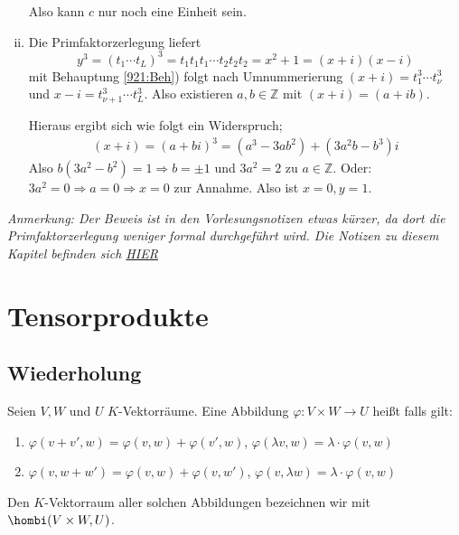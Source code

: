 \begin{enumerate}[i)]
	Also kann $c$ nur noch eine Einheit sein.
	\item Die Primfaktorzerlegung liefert 
	\[
		y^3 = (t_1 \cdots t_L)^3 = t_1 t_1 t_1 \cdots t_2 t_2 t_2 = x^2 +1 = (x +i) (x-i)
	\]
	mit Behauptung \ref{921:Beh}) folgt nach Umnummerierung $(x+i)= t_1 ^3 \cdots t_{\nu} ^3$ und $x-i = t_{\nu +1} ^3 \cdots t_L^3$. Also existieren $a,b \in \mathds{Z}$ mit 
	$(x+i)= (a+ ib)$.
	
	Hieraus ergibt sich wie folgt ein Widerspruch;
	\begin{align*}
		(x+i) = (a+ bi)^3 = (a^3 - 3 ab^2) + (3a^2b - b^3)i
	\end{align*}
	Also $b (3a^2 - b^2) = 1 \Rightarrow b = \pm 1$ und $3 a^2 = 2$  \light   zu $a \in \mathds{Z}$. Oder:  $3 a^2 = 0 \Rightarrow a=0 \Rightarrow x=0$ \light zur Annahme. Also ist $x=0, y=1$. \bewende
\end{enumerate}
\vfill
{\color{Honeydew4} \itshape  \footnotesize Anmerkung: Der Beweis ist in den Vorlesungsnotizen etwas kürzer, da dort die Primfaktorzerlegung weniger formal 
durchgeführt wird. Die Notizen zu diesem Kapitel befinden sich 
\href{http://wwwmath.uni-muenster.de/reine/u/topos/lehre/SS2013/LineareAlgebra2/additional/LA2EuklidRingeHIR.pdf}{HIER}}
\newpage
\section{Tensorprodukte} %
\label{sec:10}

\subsection[Wiederholung: bilineare Abbildungen]{Wiederholung} %
\label{sub:101}
Seien $V,W$ und $U$ $K$-Vektorräume. Eine Abbildung $\varphi : V \times W \to U$ heißt  falls gilt:
\begin{enumerate}[(1)]
	\item $\varphi(v+v', w) = \varphi (v,w) +\varphi (v',w)$, $\varphi (\lambda v, w) = \lambda \cdot \varphi(v,w)$
	\item $\varphi(v,w+w') = \varphi(v,w) + \varphi(v,w') $, $\varphi (v, \lambda w) = \lambda \cdot \varphi(v,w)$
\end{enumerate} 
Den $K$-Vektorraum aller solchen Abbildungen bezeichnen wir mit $\hombi(V \times W, U)$.

